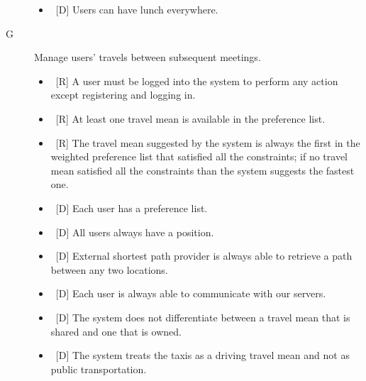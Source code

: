 \begin{description}
\begin{itemize}
\item~[D] Users can have lunch everywhere.
\end{itemize}

\item[G\thecountReq] Manage users’ travels between subsequent meetings.

\begin{itemize}
\item~[R] A user must be logged into the system to perform any action except registering and logging in.
\item~[R] At least one travel mean is available in the preference list.
\item~[R] The travel mean suggested by the system is always the first in the weighted preference list that satisfied all the constraints; if no travel mean satisfied all the constraints than the system suggests the fastest one.
\end{itemize}

\begin{itemize}
\item~[D] Each user has a preference list.
\item~[D] All users always have a position.
\item~[D] External shortest path provider is always able to retrieve a path between any two locations.
\item~[D] Each user is always able to communicate with our servers.
\item~[D] The system does not differentiate between a travel mean that is shared and one that is owned.
\item~[D] The system treats the taxis as a driving travel mean and not as public transportation.
\end{itemize}
\end{description}